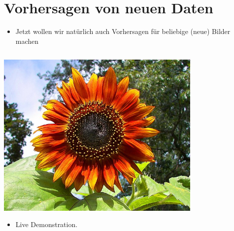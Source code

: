 \documentclass[t]{beamer}
\newcommand\pycode[1]{\inputminted[frame=lines, framesep=2mm, fontsize=\normalsize]{python}{#1}}
\begin{document}
\section{Vorhersagen von neuen Daten}
\begin{frame}
    \begin{itemize}
        \item Jetzt wollen wir natürlich auch Vorhersagen für beliebige (neue) Bilder machen
    \end{itemize}
    \pycode{./code-snippets/predict-new-image.py}
    \begin{minipage}{0.5\textwidth}
        \includegraphics[width=0.75\textwidth]{./teach-plots/592px-Red_sunflower.jpg}
    \end{minipage}\hfill
    \begin{minipage}{0.5\textwidth}
        \begin{itemize}
            \item \textcolor{rwthblue}{Live Demonstration.}
        \end{itemize}
    \end{minipage}
\end{frame}
\end{document}
